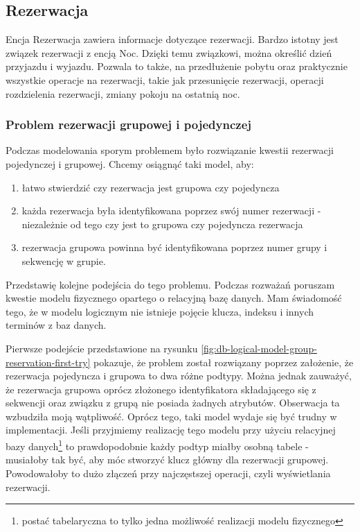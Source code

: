 \documentclass[a4paper,onecolumn,oneside,11pt,wide,floatssmall]{mwrep}
\theoremstyle{definition}
\theoremstyle{plain}%
\theoremstyle{remark}
\begin{document}
\subsection{Rezerwacja}
Encja Rezerwacja zawiera informacje dotyczące rezerwacji. Bardzo istotny jest związek rezerwacji z encją Noc. Dzięki temu związkowi, można określić dzień przyjazdu i wyjazdu. Pozwala to także, na przedłużenie pobytu oraz praktycznie wszystkie operacje na rezerwacji, takie jak przesunięcie rezerwacji, operacji rozdzielenia rezerwacji, zmiany pokoju na ostatnią noc. 

\subsubsection{Problem rezerwacji grupowej i pojedynczej}

Podczas modelowania sporym problemem było rozwiązanie kwestii rezerwacji pojedynczej i grupowej. Chcemy osiągnąć taki model, aby:

\begin{enumerate}
  \item łatwo stwierdzić czy rezerwacja jest grupowa czy pojedyncza
  \item każda rezerwacja była identyfikowana poprzez swój numer rezerwacji - niezależnie od tego czy jest to grupowa czy pojedyncza rezerwacja
  \item rezerwacja grupowa powinna być identyfikowana poprzez numer grupy i sekwencję w grupie.
\end{enumerate}

Przedstawię kolejne podejścia do tego problemu. Podczas rozważań poruszam kwestie modelu fizycznego opartego o relacyjną bazę danych. Mam świadomość tego, że w modelu logicznym nie istnieje pojęcie klucza, indeksu i innych terminów z baz danych. 

Pierwsze podejście przedstawione na rysunku \ref{fig:db-logical-model-group-reservation-first-try} pokazuje, że problem został rozwiązany poprzez założenie, że rezerwacja pojedyncza i grupowa to dwa różne podtypy. Można jednak zauważyć, że rezerwacja grupowa oprócz złożonego identyfikatora składającego się z sekwencji oraz związku z grupą nie posiada żadnych atrybutów. Obserwacja ta wzbudziła moją wątpliwość. Oprócz tego, taki model wydaje się być trudny w implementacji. Jeśli przyjmiemy realizację tego modelu przy użyciu relacyjnej bazy danych\footnote{postać tabelaryczna to tylko jedna możliwość realizacji modelu fizycznego} to prawdopodobnie każdy podtyp miałby osobną tabele - musiałoby tak być, aby móc stworzyć klucz główny dla rezerwacji grupowej. Powodowałoby to dużo złączeń przy najczęstszej operacji, czyli wyświetlania rezerwacji.
\end{document}
